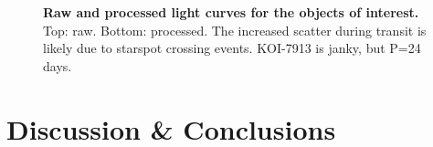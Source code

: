 \documentclass[12pt,twocolumn,linenumbers]{aastex63}
\begin{document}
\begin{figure}[tp]
\begin{center}
		\vspace{-1.45cm}	
	\end{center}
	\vspace{-0.7cm}
	\caption{
		{\bf Raw and processed light curves for the objects of
    interest.} Top: raw.  Bottom: processed.
    The increased scatter during transit is likely due to starspot
    crossing events.  KOI-7913 is janky, but P=24 days.
		\label{fig:planets}
	}
\end{figure}


\section{Discussion \& Conclusions}
\label{sec:conc}
\end{document}
